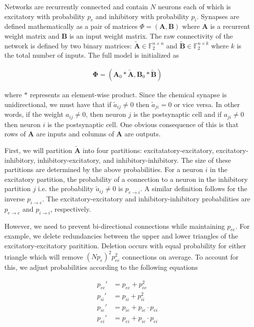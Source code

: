 \documentclass{article} %
\begin{document}
Networks are recurrently connected and contain $N$ neurons each of which is excitatory with probability $p_{e}$ and inhibitory with probability $p_{i}$. Synapses are defined mathematically as a pair of matrices $\Phi = (\mathbf{A} , \mathbf{B})$ where $\mathbf{A}$ is a recurrent weight matrix and $\mathbf{B}$ is an input weight matrix. The raw connectivity of the network is defined by two binary matrices: $\tilde{\mathbf{A}} \in \mathbb{F}_{2}^{n\times n}$ and $\tilde{\mathbf{B}} \in \mathbb{F}_{2}^{n\times k}$ where $k$ is the total number of inputs. The full model is initialized as 

\begin{align*}
\mathbf{\Phi} = (\mathbf{A}_{0}*\tilde{\mathbf{A}}  , \mathbf{B}_{0}*\tilde{\mathbf{B}} )
\end{align*}


where $*$ represents an element-wise product. Since the chemical synapse is unidirectional, we must have that if $\tilde{a}_{ij} \neq 0$ then $\tilde{a}_{ji} = 0$ or vice versa. In other words, if the weight $a_{ij} \neq 0$, then neuron $j$ is the postsynaptic cell and if $a_{ji} \neq 0$ then neuron $i$ is the postsynaptic cell. One obvious consequence of this is that rows of $\mathbf{A}$ are inputs and columns of $\mathbf{A}$ are outputs.

First, we will partition $\tilde{\mathbf{A}}$ into four partitions: excitatatory-excitatory, excitatory-inhibitory, inhibitory-excitatory, and inhibitory-inhibitory. The size of these partitions are determined by the above probabilities. For a neuron $i$ in the excitatory partition, the probability of a connection to a neuron in the inhibitory partition $j$ i.e. the probability $\tilde{a}_{ij} \neq 0$ is $p_{e\rightarrow i}$. A similar definition follows for the inverse  $p_{i\rightarrow e}$. The excitatory-excitatory and inhibitory-inhibitory probabilities are  $p_{e\rightarrow e}$ and  $p_{i\rightarrow i}$, respectively. 

However, we need to prevent bi-directional connections while maintaining $p_{ee}$. For example, we delete redundancies between the upper and lower triangles of the excitatory-excitatory paritition. Deletion occurs with equal probability for either triangle which will remove $(Np_{e})^{2}p_{ee}^{2}$ connections on average. To account for this, we  adjust probabilities according to the following equations

\begin{align*}
p_{ee}' &= p_{ee} + p_{ee}^{2}\\
p_{ii}' &= p_{ii} + p_{ii}^{2}\\
p_{ie}' &= p_{ie} + p_{ie}\cdot p_{ei}\\
p_{ei}' &= p_{ei} + p_{ie}\cdot p_{ei}
\end{align*}
\end{document}
